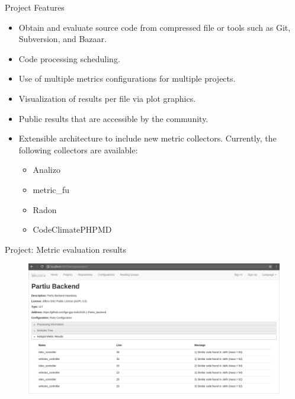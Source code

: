 \begin{block}{Project Features}
    \begin{itemize}
        \item Obtain and evaluate source code from compressed file or
            tools such as Git, Subversion, and Bazaar.
        \item Code processing scheduling.
        \item Use of multiple metrics configurations for multiple
            projects.
        \item Visualization of results per file via plot graphics.
        \item Public results that are accessible by the community.
        \item Extensible architecture to include new metric collectors.
            Currently, the following collectors are available:
            \begin{itemize}
                \item Analizo
                \item metric\_fu
                \item Radon
                \item CodeClimatePHPMD
            \end{itemize}
    \end{itemize}
\end{block}

\begin{block}{Project: Metric evaluation results}
    \begin{figure}
        \begin{center}
            \includegraphics[width=\textwidth]{figures/MetricProcessing.png}
                \label{fig:feature1}
        \end{center}
    \end{figure}
\end{block}

